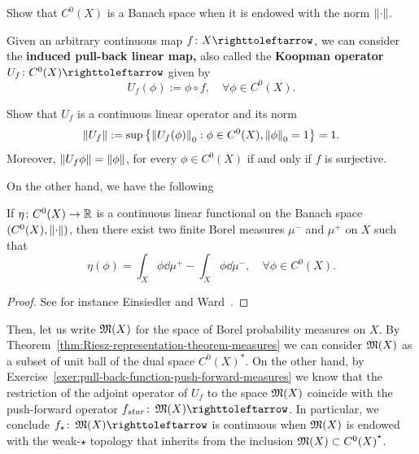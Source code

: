 \begin{exercise}
  Show that $C^{0}(X)$ is a Banach space when it is endowed with the norm $\left\|{\cdot}\right\|$.
\end{exercise}

Given an arbitrary continuous map $f\colon X\carr$, we can consider the \textbf{induced pull-back linear map,} also called the \textbf{Koopman operator} $U_{f}\colon C^{0}(X)\carr$  given by
\begin{displaymath}
  U_{f}(\phi):=\phi\circ f, \quad\forall \phi\in C^{0}(X).
\end{displaymath}

\begin{exercise}
  Show that $U_{f}$ is a continuous linear operator and its norm
  \begin{displaymath}
    \left\|{U_{f}}\right\|:=\sup\left\{\left\|{U_{f}(\phi)}\right\|_{0} : \phi\in C^{0}(X), \left\|{\phi}\right\|_{0}=1\right\}= 1.
  \end{displaymath}
  Moreover, $\left\|{U_{f}\phi}\right\|=\left\|{\phi}\right\|$, for every $\phi\in C^{0}(X)$ if and only if $f$ is surjective.
\end{exercise}

On the other hand, we have the following
\begin{theorem}\label{thm:Riesz-representation-theorem-measures}
  If $\eta\colon C^{0}(X)\to\mathbb{R}$ is a continuous linear functional on the Banach space $(C^{0}(X),\left\|{\cdot}\right\|)$, then there exist two finite Borel measures $\mu^{-}$ and $\mu^{+}$ on $X$ such that
  \begin{displaymath}
    \eta(\phi)=\int_{X}\phi\dd\mu^{+} - \int_{X}\phi\dd\mu^{-}, \quad\forall\phi\in C^{0}(X).
  \end{displaymath}
\end{theorem}

\begin{proof}
  See for instance Einsiedler and Ward~\cite[Theorem 7.44]{EinsiedlerWardFunctionalAnalysisBook}.
\end{proof}

Then, let us write $\operatorname{\mathfrak{M}}(X)$ for the space of Borel probability measures on $X$. By Theorem~\ref{thm:Riesz-representation-theorem-measures} we can consider $\operatorname{\mathfrak{M}}(X)$ as a subset of unit ball of the dual space ${C^{0}(X)}^{\star}$. On the other hand, by Exercise~\ref{exer:pull-back-function-push-forward-measures} we know that the restriction of the adjoint operator of $U_{f}$ to the space $\operatorname{\mathfrak{M}}(X)$ coincide with the push-forward operator $f_{star}\colon\M(X)\carr$. In particular, we conclude $f_{\star}\colon\M(X)\carr$ is continuous when $\operatorname{\mathfrak{M}}(X)$ is endowed with the weak-$\star$ topology that inherits from the inclusion $\operatorname{\mathfrak{M}}(X)\subset {C^{0}(X)}^{\star}$.

